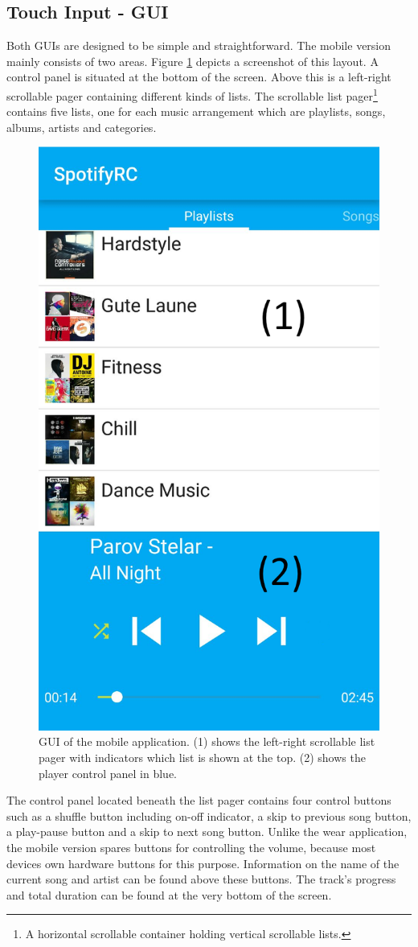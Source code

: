 \subsection{Touch Input - \ac{GUI}}
Both \ac{GUI}s are designed to be simple and straightforward. The mobile version mainly consists of two areas. Figure \ref{fig:mobileGUI} depicts a screenshot of this layout. A control panel is situated at the bottom of the screen. Above this is a left-right scrollable pager containing different kinds of lists.  The scrollable list pager\footnote{A horizontal scrollable container holding vertical scrollable lists.} contains five lists, one for each music arrangement which are playlists, songs, albums, artists and categories.
\begin{figure}[bth]
	\myfloatalign
	\includegraphics[width=.45\linewidth]{img/mobileGUIlabeled.png}
	\caption{\ac{GUI} of the mobile application. (1) shows the left-right scrollable list pager with indicators which list is shown at the top. (2) shows the player control panel in blue.}
	\label{fig:mobileGUI}
\end{figure}
The control panel located beneath the list pager contains four control buttons such as a shuffle button including on-off indicator, a skip to previous song button, a play-pause button and a skip to next song button. Unlike the wear application, the mobile version spares buttons for controlling the volume, because most devices own hardware buttons for this purpose. Information on the name of the current song and artist can be found above these buttons. The track's progress and total duration can be found at the very bottom of the screen. \\

